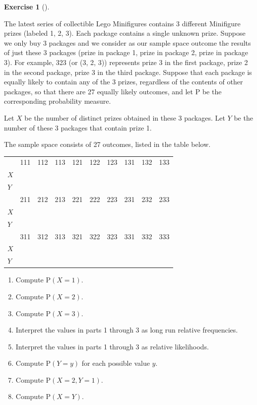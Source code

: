 \documentclass[
  letterpaper,
  DIV=11,
  numbers=noendperiod]{scrreprt}
\providecommand{\tightlist}{%
  \setlength{\itemsep}{0pt}\setlength{\parskip}{0pt}}
\theoremstyle{plain}
\theoremstyle{definition}
\theoremstyle{definition}
\newtheorem{exercise}{Exercise}[chapter]
\theoremstyle{definition}
\theoremstyle{remark}
\begin{document}
\begin{exercise}[]\protect\hypertarget{exr-probspace-collector3-b}{}\label{exr-probspace-collector3-b}

The latest series of collectible Lego Minifigures contains 3 different
Minifigure prizes (labeled 1, 2, 3). Each package contains a single
unknown prize. Suppose we only buy 3 packages and we consider as our
sample space outcome the results of just these 3 packages (prize in
package 1, prize in package 2, prize in package 3). For example, 323 (or
(3, 2, 3)) represents prize 3 in the first package, prize 2 in the
second package, prize 3 in the third package. Suppose that each package
is equally likely to contain any of the 3 prizes, regardless of the
contents of other packages, so that there are 27 equally likely
outcomes, and let \(\textrm{P}\) be the corresponding probability
measure.

Let \(X\) be the number of distinct prizes obtained in these 3 packages.
Let \(Y\) be the number of these 3 packages that contain prize 1.

The sample space consists of 27 outcomes, listed in the table below.

\begin{longtable}[]{@{}llllllllll@{}}
\toprule\noalign{}
\endhead
\bottomrule\noalign{}
\endlastfoot
& 111 & 112 & 113 & 121 & 122 & 123 & 131 & 132 & 133 \\
\(X\) & & & & & & & & & \\
\(Y\) & & & & & & & & & \\
& 211 & 212 & 213 & 221 & 222 & 223 & 231 & 232 & 233 \\
\(X\) & & & & & & & & & \\
\(Y\) & & & & & & & & & \\
& 311 & 312 & 313 & 321 & 322 & 323 & 331 & 332 & 333 \\
\(X\) & & & & & & & & & \\
\(Y\) & & & & & & & & & \\
\end{longtable}

\begin{enumerate}
\def\labelenumi{\arabic{enumi}.}
\tightlist
\item
  Compute \(\textrm{P}(X = 1)\).
\item
  Compute \(\textrm{P}(X = 2)\).
\item
  Compute \(\textrm{P}(X = 3)\).
\item
  Interpret the values in parts 1 through 3 as long run relative
  frequencies.
\item
  Interpret the values in parts 1 through 3 as relative likelihoods.
\item
  Compute \(\textrm{P}(Y = y)\) for each possible value \(y\).
\item
  Compute \(\textrm{P}(X = 2, Y = 1)\).
\item
  Compute \(\textrm{P}(X = Y)\).
\end{enumerate}

\end{exercise}
\end{document}
